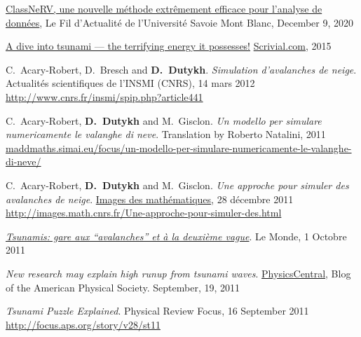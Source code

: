 \documentclass[final, a4paper, oneside, 12pt]{article}
\numberwithin{equation}{section}
\begin{document}
\begin{etaremune}

  \item \href{https://www.univ-smb.fr/2020/12/09/classnerv-une-nouvelle-methode-extremement-efficace-pour-lanalyse-de-donnees/}{ClassNeRV, une nouvelle m\'ethode extr\^emement efficace pour l'analyse de donn\'ees}, Le Fil d'Actualit\'e de l'Universit\'e Savoie Mont Blanc, December 9, 2020

  \item \href{http://www.scrivial.com/articles/a-dive-into-tsunami-the-terrifying-energy-it-possesses}{A dive into tsunami --- the terrifying energy it possesses!} \href{http://www.scrivial.com/}{Scrivial.com}, 2015
  
  \item C.~Acary-Robert, D.~Bresch and \textbf{D.~Dutykh}. \textit{Simulation d'avalanches de neige}. Actualit\'es scientifiques de l'INSMI (CNRS), 14 mars 2012 \\
  \url{http://www.cnrs.fr/insmi/spip.php?article441}
  
  \item C.~Acary-Robert, \textbf{D.~Dutykh} and M.~Gisclon. \textit{Un modello per simulare numericamente le valanghe di neve}. Translation by Roberto Natalini, 2011 \\
  {\small\url{maddmaths.simai.eu/focus/un-modello-per-simulare-numericamente-le-valanghe-di-neve/}}

  \item C.~Acary-Robert, \textbf{D.~Dutykh} and M.~Gisclon. \textit{Une approche pour simuler des avalanches de neige}. \href{http://images.math.cnrs.fr/}{Images des math\'ematiques}, 28 d\'ecembre 2011 \\
  \url{http://images.math.cnrs.fr/Une-approche-pour-simuler-des.html}
  
  \item \href{https://www.lemonde.fr/planete/article/2011/09/29/tsunamis-gare-aux-avalanches-et-a-la-deuxieme-vague_1580151_3244.html}{\textit{Tsunamis: gare aux ``avalanches'' et \`a la deuxi\`eme vague}}. Le Monde, 1 Octobre 2011

  \item \textit{New research may explain high runup from tsunami waves}. \href{http://physicsbuzz.physicscentral.com/2011/09/new-research-may-explain-high-runup.html}{PhysicsCentral}, Blog of the American Physical Society. September, 19, 2011

  \item \textit{Tsunami Puzzle Explained}. Physical Review Focus, 16 September 2011 \\
  \url{http://focus.aps.org/story/v28/st11}
  

\end{etaremune}
\end{document}
